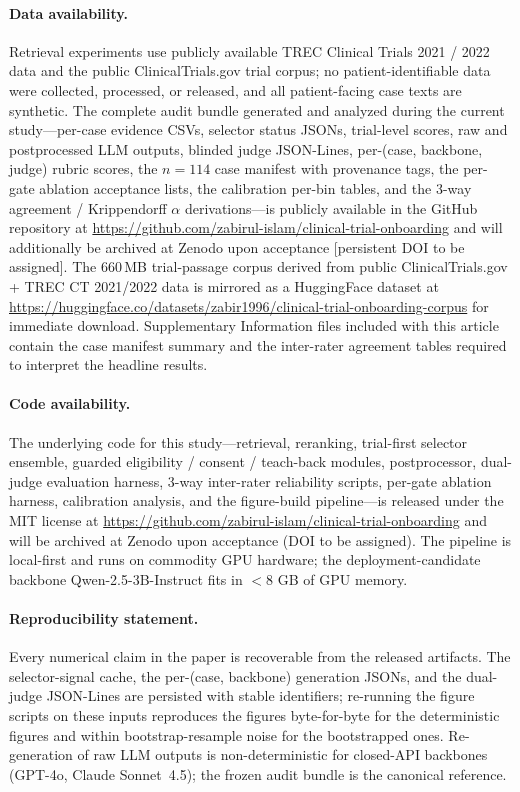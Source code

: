 \documentclass[11pt]{article}
\begin{document}
\paragraph{Data availability.} Retrieval experiments use publicly available TREC Clinical Trials 2021 / 2022 data \citep{roberts2021trec,koopman2016trec,soboroff2022trec} and the public ClinicalTrials.gov trial corpus; no patient-identifiable data were collected, processed, or released, and all patient-facing case texts are synthetic. The complete audit bundle generated and analyzed during the current study---per-case evidence CSVs, selector status JSONs, trial-level scores, raw and postprocessed LLM outputs, blinded judge JSON-Lines, per-(case, backbone, judge) rubric scores, the $n=114$ case manifest with provenance tags, the per-gate ablation acceptance lists, the calibration per-bin tables, and the 3-way agreement / Krippendorff $\alpha$ derivations---is publicly available in the GitHub repository at \url{https://github.com/zabirul-islam/clinical-trial-onboarding} and will additionally be archived at Zenodo upon acceptance [persistent DOI to be assigned]. The 660\,MB trial-passage corpus derived from public ClinicalTrials.gov + TREC CT 2021/2022 data is mirrored as a HuggingFace dataset at \url{https://huggingface.co/datasets/zabir1996/clinical-trial-onboarding-corpus} for immediate download. Supplementary Information files included with this article contain the case manifest summary and the inter-rater agreement tables required to interpret the headline results.

\paragraph{Code availability.} The underlying code for this study---retrieval, reranking, trial-first selector ensemble, guarded eligibility / consent / teach-back modules, postprocessor, dual-judge evaluation harness, 3-way inter-rater reliability scripts, per-gate ablation harness, calibration analysis, and the figure-build pipeline---is released under the MIT license at \url{https://github.com/zabirul-islam/clinical-trial-onboarding} and will be archived at Zenodo upon acceptance (DOI to be assigned). The pipeline is local-first and runs on commodity GPU hardware; the deployment-candidate backbone Qwen-2.5-3B-Instruct fits in $<8$ GB of GPU memory.
\fussy

\paragraph{Reproducibility statement.} Every numerical claim in the paper is recoverable from the released artifacts. The selector-signal cache, the per-(case, backbone) generation JSONs, and the dual-judge JSON-Lines are persisted with stable identifiers; re-running the figure scripts on these inputs reproduces the figures byte-for-byte for the deterministic figures and within bootstrap-resample noise for the bootstrapped ones. Re-generation of raw LLM outputs is non-deterministic for closed-API backbones (GPT-4o, Claude Sonnet~4.5); the frozen audit bundle is the canonical reference.
\end{document}
